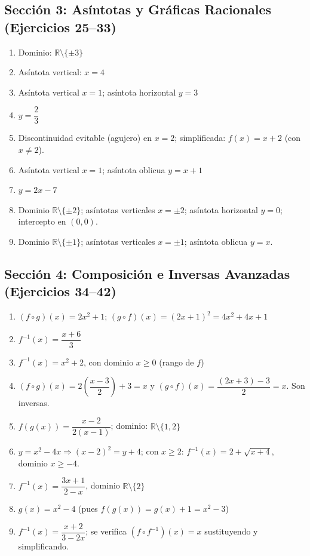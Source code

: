 \documentclass[12pt, letterpaper]{article}
\begin{document}
  \subsection*{Sección 3: Asíntotas y Gráficas Racionales (Ejercicios 25--33)}
  \begin{enumerate}[resume=respuestas, leftmargin=*, label=\textbf{\arabic*.}]
    \item Dominio: $\mathbb{R} \setminus \{\pm 3\}$
    \item Asíntota vertical: $x = 4$
    \item Asíntota vertical $x = 1$; \quad asíntota horizontal $y = 3$
    \item $y = \dfrac{2}{3}$
    \item Discontinuidad evitable (agujero) en $x = 2$; simplificada: $f(x) = x + 2$ (con $x \neq 2$).
    \item Asíntota vertical $x = 1$; \quad asíntota oblicua $y = x + 1$
    \item $y = 2x - 7$
    \item Dominio $\mathbb{R} \setminus \{\pm 2\}$; asíntotas verticales $x = \pm 2$; asíntota horizontal $y = 0$; intercepto en $(0, 0)$.
    \item Dominio $\mathbb{R} \setminus \{\pm 1\}$; asíntotas verticales $x = \pm 1$; asíntota oblicua $y = x$.
  \end{enumerate}

  \subsection*{Sección 4: Composición e Inversas Avanzadas (Ejercicios 34--42)}
  \begin{enumerate}[resume=respuestas, leftmargin=*, label=\textbf{\arabic*.}]
    \item $(f \circ g)(x) = 2x^2 + 1$; \quad $(g \circ f)(x) = (2x + 1)^2 = 4x^2 + 4x + 1$
    \item $f^{-1}(x) = \dfrac{x + 6}{3}$
    \item $f^{-1}(x) = x^2 + 2$, con dominio $x \ge 0$ (rango de $f$)
    \item $(f \circ g)(x) = 2\left(\dfrac{x - 3}{2}\right) + 3 = x$ \quad y \quad $(g \circ f)(x) = \dfrac{(2x + 3) - 3}{2} = x$. Son inversas.
    \item $f(g(x)) = \dfrac{x - 2}{2(x - 1)}$; dominio: $\mathbb{R} \setminus \{1, 2\}$
    \item $y = x^2 - 4x \Rightarrow (x - 2)^2 = y + 4$; con $x \ge 2$: $f^{-1}(x) = 2 + \sqrt{x + 4}$, dominio $x \ge -4$.
    \item $f^{-1}(x) = \dfrac{3x + 1}{2 - x}$, dominio $\mathbb{R} \setminus \{2\}$
    \item $g(x) = x^2 - 4$ \quad (pues $f(g(x)) = g(x) + 1 = x^2 - 3$)
    \item $f^{-1}(x) = \dfrac{x + 2}{3 - 2x}$; se verifica $(f \circ f^{-1})(x) = x$ sustituyendo y simplificando.
  \end{enumerate}
\end{document}
